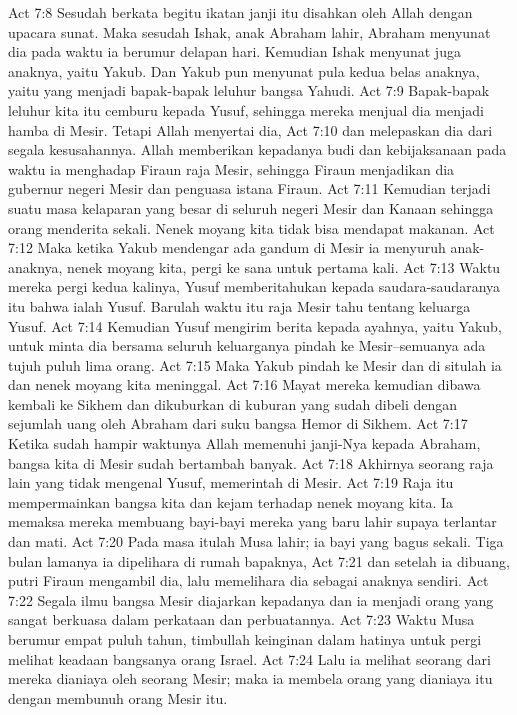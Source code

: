 Act 7:8  Sesudah berkata begitu ikatan janji itu disahkan oleh Allah dengan upacara sunat. Maka sesudah Ishak, anak Abraham lahir, Abraham menyunat dia pada waktu ia berumur delapan hari. Kemudian Ishak menyunat juga anaknya, yaitu Yakub. Dan Yakub pun menyunat pula kedua belas anaknya, yaitu yang menjadi bapak-bapak leluhur bangsa Yahudi.
Act 7:9  Bapak-bapak leluhur kita itu cemburu kepada Yusuf, sehingga mereka menjual dia menjadi hamba di Mesir. Tetapi Allah menyertai dia,
Act 7:10  dan melepaskan dia dari segala kesusahannya. Allah memberikan kepadanya budi dan kebijaksanaan pada waktu ia menghadap Firaun raja Mesir, sehingga Firaun menjadikan dia gubernur negeri Mesir dan penguasa istana Firaun.
Act 7:11  Kemudian terjadi suatu masa kelaparan yang besar di seluruh negeri Mesir dan Kanaan sehingga orang menderita sekali. Nenek moyang kita tidak bisa mendapat makanan.
Act 7:12  Maka ketika Yakub mendengar ada gandum di Mesir ia menyuruh anak-anaknya, nenek moyang kita, pergi ke sana untuk pertama kali.
Act 7:13  Waktu mereka pergi kedua kalinya, Yusuf memberitahukan kepada saudara-saudaranya itu bahwa ialah Yusuf. Barulah waktu itu raja Mesir tahu tentang keluarga Yusuf.
Act 7:14  Kemudian Yusuf mengirim berita kepada ayahnya, yaitu Yakub, untuk minta dia bersama seluruh keluarganya pindah ke Mesir--semuanya ada tujuh puluh lima orang.
Act 7:15  Maka Yakub pindah ke Mesir dan di situlah ia dan nenek moyang kita meninggal.
Act 7:16  Mayat mereka kemudian dibawa kembali ke Sikhem dan dikuburkan di kuburan yang sudah dibeli dengan sejumlah uang oleh Abraham dari suku bangsa Hemor di Sikhem.
Act 7:17  Ketika sudah hampir waktunya Allah memenuhi janji-Nya kepada Abraham, bangsa kita di Mesir sudah bertambah banyak.
Act 7:18  Akhirnya seorang raja lain yang tidak mengenal Yusuf, memerintah di Mesir.
Act 7:19  Raja itu mempermainkan bangsa kita dan kejam terhadap nenek moyang kita. Ia memaksa mereka membuang bayi-bayi mereka yang baru lahir supaya terlantar dan mati.
Act 7:20  Pada masa itulah Musa lahir; ia bayi yang bagus sekali. Tiga bulan lamanya ia dipelihara di rumah bapaknya,
Act 7:21  dan setelah ia dibuang, putri Firaun mengambil dia, lalu memelihara dia sebagai anaknya sendiri.
Act 7:22  Segala ilmu bangsa Mesir diajarkan kepadanya dan ia menjadi orang yang sangat berkuasa dalam perkataan dan perbuatannya.
Act 7:23  Waktu Musa berumur empat puluh tahun, timbullah keinginan dalam hatinya untuk pergi melihat keadaan bangsanya orang Israel.
Act 7:24  Lalu ia melihat seorang dari mereka dianiaya oleh seorang Mesir; maka ia membela orang yang dianiaya itu dengan membunuh orang Mesir itu.

